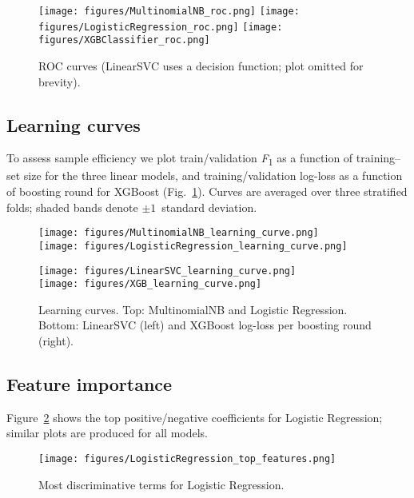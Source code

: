 \documentclass[11pt]{article}
\begin{document}
\begin{figure}[h]
\centering
\texttt{[image: figures/MultinomialNB\_roc.png]}
\texttt{[image: figures/LogisticRegression\_roc.png]}
\texttt{[image: figures/XGBClassifier\_roc.png]}
\caption{ROC curves (LinearSVC uses a decision function; plot omitted for brevity).}
\end{figure}

\subsection{Learning curves}

To assess sample efficiency we plot train/validation
\textit{F}\textsubscript{1} as a function of training–set size for the three
linear models, and training/validation log-loss as a function of boosting
round for XGBoost (Fig.~\ref{fig:curves}).  
Curves are averaged over three stratified folds; shaded bands denote
$\pm1$~standard deviation.

\begin{figure}[h]
\centering
\begin{minipage}{.48\linewidth}
  \centering
  \texttt{[image: figures/MultinomialNB\_learning\_curve.png]}\\[2pt]
  \texttt{[image: figures/LogisticRegression\_learning\_curve.png]}
\end{minipage}\hfill
\begin{minipage}{.48\linewidth}
  \centering
  \texttt{[image: figures/LinearSVC\_learning\_curve.png]}\\[2pt]
  \texttt{[image: figures/XGB\_learning\_curve.png]}
\end{minipage}
\caption{Learning curves.  
Top: MultinomialNB and Logistic Regression.
Bottom: LinearSVC (left) and XGBoost log-loss per boosting round (right).}
\label{fig:curves}
\end{figure}

\subsection{Feature importance}
Figure~\ref{fig:feat} shows the top positive/negative
coefficients for Logistic Regression; similar plots are produced
for all models.

\begin{figure}[h]
\centering
\texttt{[image: figures/LogisticRegression\_top\_features.png]}
\caption{Most discriminative terms for Logistic Regression.}
\label{fig:feat}
\end{figure}
\end{document}
